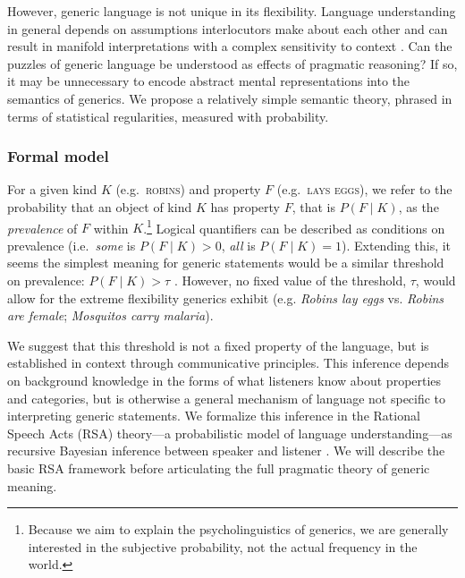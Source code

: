 \documentclass[12pt,letterpaper]{article}
\begin{document}
However, generic language is not unique in its flexibility.
Language understanding in general depends on assumptions interlocutors make about each other and can result in manifold interpretations with a complex sensitivity to context \cite{Clark1996,Grice1975,Levinson2000}. 
Can the puzzles of generic language be understood as effects of pragmatic reasoning?
If so, it may be unnecessary to encode abstract mental representations into the semantics of generics.
We propose a relatively simple semantic theory, phrased in terms of statistical regularities, measured with probability. 


\subsubsection*{Formal model}

For a given kind $K$ (e.g.~\textsc{robins}) and property $F$ (e.g.~\textsc{lays eggs}), we refer to the probability that an object of kind $K$ has property $F$, that is $P(F\mid K)$, as the \emph{prevalence} of $F$ within $K$.\footnote{Because we aim to explain the psycholinguistics of generics, we are generally interested in the subjective probability, not the actual frequency in the world.}
Logical quantifiers can be described as conditions on prevalence (i.e.~\emph{some} is $P(F\mid K)>0$, \emph{all} is $P(F\mid K)=1$). 
Extending this, it seems the simplest meaning for generic statements would be a similar threshold on prevalence: $P(F\mid K)>\tau$ \cite{Cohen1999}. 
However, no fixed value of the threshold, $\tau$, would allow for the extreme flexibility generics exhibit (e.g. \emph{Robins lay eggs} vs. \emph{Robins are female}; \emph{Mosquitos carry malaria}).%


We suggest that this threshold is not a fixed property of the language, but is established in context through communicative principles.
This inference depends on background knowledge in the forms of what listeners know about properties and categories, but is otherwise a general mechanism of language not specific to interpreting generic statements.
We formalize this inference in the Rational Speech Acts (RSA) theory---a probabilistic model of language understanding---as recursive Bayesian inference between speaker and listener \cite{Frank2012,Goodman2013}.
We will describe the basic RSA framework before articulating the full pragmatic theory of generic meaning.
\end{document}
